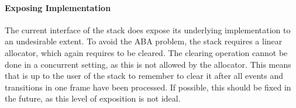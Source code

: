 \paragraph{Exposing Implementation}
The current interface of the stack does expose its underlying implementation to an undesirable extent.
To avoid the ABA problem, the stack requires a linear allocator, which again requires
to be cleared.
The clearing operation cannot be done in a concurrent setting, as this is not allowed by the allocator.
This means that is up to the user of the stack to remember to clear it after all events and transitions in one frame have been processed. 
If possible, this should be fixed in the future, as this level of exposition is not ideal.